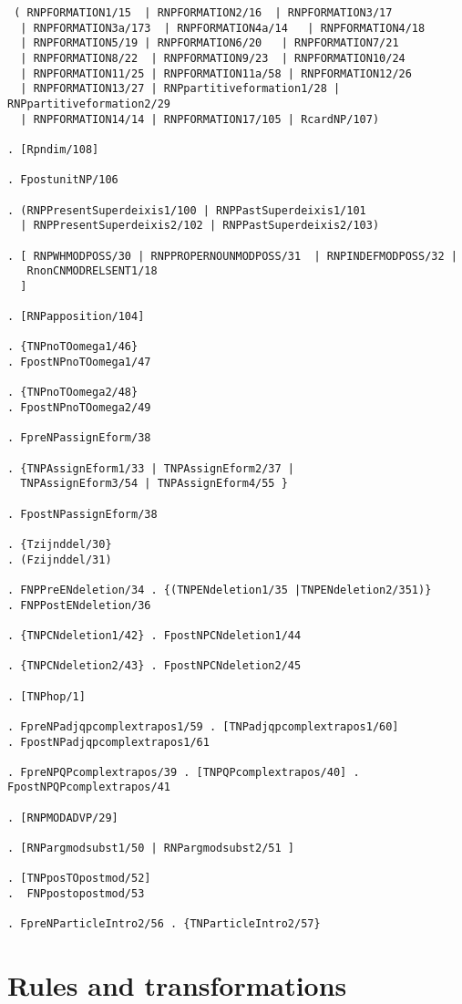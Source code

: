 \begin{verbatim}
 ( RNPFORMATION1/15  | RNPFORMATION2/16  | RNPFORMATION3/17  
  | RNPFORMATION3a/173  | RNPFORMATION4a/14   | RNPFORMATION4/18  
  | RNPFORMATION5/19 | RNPFORMATION6/20   | RNPFORMATION7/21  
  | RNPFORMATION8/22  | RNPFORMATION9/23  | RNPFORMATION10/24 
  | RNPFORMATION11/25 | RNPFORMATION11a/58 | RNPFORMATION12/26 
  | RNPFORMATION13/27 | RNPpartitiveformation1/28 | RNPpartitiveformation2/29 
  | RNPFORMATION14/14 | RNPFORMATION17/105 | RcardNP/107) 

. [Rpndim/108]

. FpostunitNP/106
 
. (RNPPresentSuperdeixis1/100 | RNPPastSuperdeixis1/101 
  | RNPPresentSuperdeixis2/102 | RNPPastSuperdeixis2/103)

. [ RNPWHMODPOSS/30 | RNPPROPERNOUNMODPOSS/31  | RNPINDEFMODPOSS/32 |
   RnonCNMODRELSENT1/18 
  ] 

. [RNPapposition/104]

. {TNPnoTOomega1/46}
. FpostNPnoTOomega1/47

. {TNPnoTOomega2/48}
. FpostNPnoTOomega2/49

. FpreNPassignEform/38

. {TNPAssignEform1/33 | TNPAssignEform2/37 | 
  TNPAssignEform3/54 | TNPAssignEform4/55 }

. FpostNPassignEform/38

. {Tzijnddel/30}
. (Fzijnddel/31)

. FNPPreENdeletion/34 . {(TNPENdeletion1/35 |TNPENdeletion2/351)} 
. FNPPostENdeletion/36 
 
. {TNPCNdeletion1/42} . FpostNPCNdeletion1/44

. {TNPCNdeletion2/43} . FpostNPCNdeletion2/45

. [TNPhop/1]

. FpreNPadjqpcomplextrapos1/59 . [TNPadjqpcomplextrapos1/60]
. FpostNPadjqpcomplextrapos1/61

. FpreNPQPcomplextrapos/39 . [TNPQPcomplextrapos/40] . FpostNPQPcomplextrapos/41

. [RNPMODADVP/29]

. [RNPargmodsubst1/50 | RNPargmodsubst2/51 ]

. [TNPposTOpostmod/52] 
.  FNPpostopostmod/53 

. FpreNParticleIntro2/56 . {TNParticleIntro2/57}

\end{verbatim}

\section{Rules and transformations}


